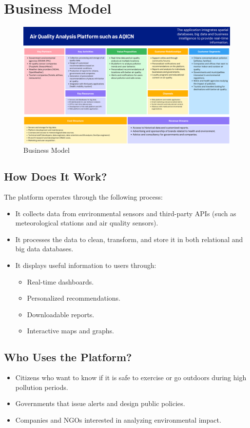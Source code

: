 \section{Business Model}

\begin{figure}[H]
  \centering
  \includegraphics[width=\linewidth]{Imagenes/Business_Model.pdf}
  \caption{Business Model}
\end{figure}

\subsection*{How Does It Work?}
The platform operates through the following process:

\begin{itemize}
  \item It collects data from environmental sensors and third-party APIs (such as meteorological stations and air quality sensors).
  \item It processes the data to clean, transform, and store it in both relational and big data databases.
  \item It displays useful information to users through:
    \begin{itemize}
      \item Real-time dashboards.
      \item Personalized recommendations.
      \item Downloadable reports.
      \item Interactive maps and graphs.
    \end{itemize}
\end{itemize}

\subsection*{Who Uses the Platform?}
\begin{itemize}
  \item Citizens who want to know if it is safe to exercise or go outdoors during high pollution periods.
  \item Governments that issue alerts and design public policies.
  \item Companies and NGOs interested in analyzing environmental impact.
\end{itemize}

